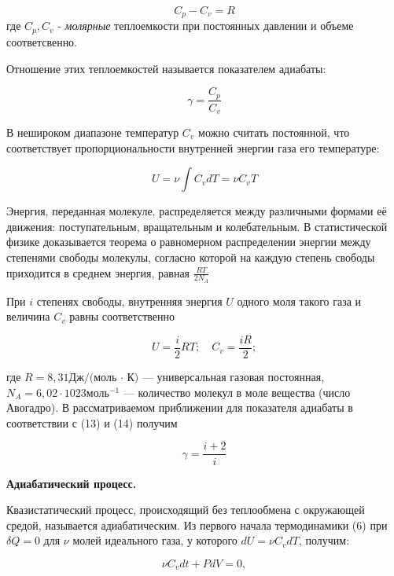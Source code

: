 \documentclass[10pt]{article}
\begin{document}
    \begin{equation}
        C_p - C_v = R
    \end{equation}
    где $C_p, C_v$ - \textit{молярные} теплоемкости при постоянных давлении и объеме соответсвенно.

    Отношение этих теплоемкостей называется показателем адиабаты:

    \begin{equation}
        \gamma = \frac{C_p}{C_v}
    \end{equation}

    В нешироком диапазоне температур $C_v$ можно считать постоянной, что соответствует пропорциональности внутренней энергии газа его температуре:

    \begin{equation}
        U = \nu \int C_v dT = \nu C_v T
    \end{equation}

    Энергия, переданная молекуле, распределяется между различными формами её движения: поступательным, вращательным и колебательным. В статистической физике доказывается теорема о равномерном распределении энергии между степенями свободы молекулы, согласно которой на каждую степень свободы приходится в среднем энергия, равная $\frac{RT}{2 N_A}$

    При $i$ степенях свободы, внутренняя энергия $U$ одного моля такого газа и величина $C_v$ равны соответственно

    \begin{equation}
        U = \frac{i}{2}RT; \quad C_v = \frac{iR}{2}; 
    \end{equation}

    где $R = 8,31 \text{Дж}/\text{(моль · К)}$ — универсальная газовая постоянная, $N_A = 6,02 · 1023 \text{моль}^{−1}$ — количество молекул в моле вещества (число Авогадро).
    В рассматриваемом приближении для показателя адиабаты в соответствии с (13) и (14) получим

    \begin{equation}
        \gamma = \frac{i+2}{i}
    \end{equation}

    \textbf{Адиабатический процесс.}

    Квазистатический процесс, происходящий без теплообмена с окружающей средой, называется адиабатическим.
    Из первого начала термодинамики (6) при $\delta Q = 0$ для $\nu$ молей идеального газа, у которого $dU = \nu C_v dT$, получим:

    \begin{equation}
        \nu C_v dt + P dV = 0,
    \end{equation}
\end{document}
